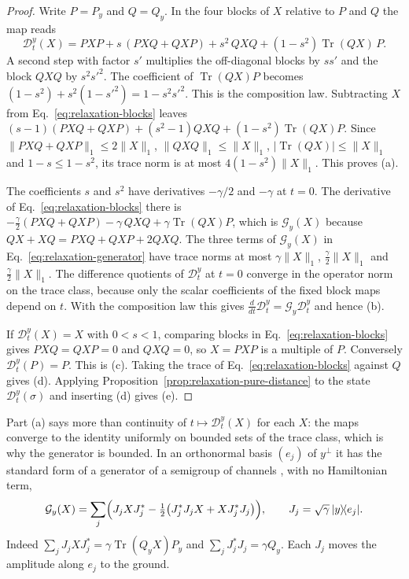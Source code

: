 \documentclass[11pt]{article}
\theoremstyle{definition}
\DeclareMathOperator{\Tr}{Tr}
\newcommand{\ket}[1]{\lvert #1\rangle}
\newcommand{\bra}[1]{\langle #1\rvert}
\begin{document}
\begin{proof}
Write $P=P_y$ and $Q=Q_y$. In the four blocks of $X$ relative to $P$ and $Q$ the map reads
\begin{equation}
 \mathcal D_t^y(X)=PXP+s\,(PXQ+QXP)+s^2\,QXQ+(1-s^2)\Tr(QX)\,P .
 \label{eq:relaxation-blocks}
\end{equation}
A second step with factor $s'$ multiplies the off-diagonal blocks by $ss'$ and the block $QXQ$ by $s^2s'^2$. The coefficient of $\Tr(QX)P$ becomes $(1-s^2)+s^2(1-s'^2)=1-s^2s'^2$. This is the composition law. Subtracting $X$ from Eq.~\eqref{eq:relaxation-blocks} leaves $(s-1)(PXQ+QXP)+(s^2-1)QXQ+(1-s^2)\Tr(QX)P$. Since $\|PXQ+QXP\|_1\le2\|X\|_1$, $\|QXQ\|_1\le\|X\|_1$, $|\Tr(QX)|\le\|X\|_1$ and $1-s\le1-s^2$, its trace norm is at most $4(1-s^2)\|X\|_1$. This proves (a).

The coefficients $s$ and $s^2$ have derivatives $-\gamma/2$ and $-\gamma$ at $t=0$. The derivative of Eq.~\eqref{eq:relaxation-blocks} there is $-\tfrac{\gamma}{2}(PXQ+QXP)-\gamma\,QXQ+\gamma\Tr(QX)P$, which is $\mathcal G_y(X)$ because $QX+XQ=PXQ+QXP+2QXQ$. The three terms of $\mathcal G_y(X)$ in Eq.~\eqref{eq:relaxation-generator} have trace norms at most $\gamma\|X\|_1$, $\tfrac{\gamma}{2}\|X\|_1$ and $\tfrac{\gamma}{2}\|X\|_1$. The difference quotients of $\mathcal D_t^y$ at $t=0$ converge in the operator norm on the trace class, because only the scalar coefficients of the fixed block maps depend on $t$. With the composition law this gives $\tfrac{d}{dt}\mathcal D_t^y=\mathcal G_y\mathcal D_t^y$ and hence (b).

If $\mathcal D_t^y(X)=X$ with $0<s<1$, comparing blocks in Eq.~\eqref{eq:relaxation-blocks} gives $PXQ=QXP=0$ and $QXQ=0$, so $X=PXP$ is a multiple of $P$. Conversely $\mathcal D_t^y(P)=P$. This is (c). Taking the trace of Eq.~\eqref{eq:relaxation-blocks} against $Q$ gives (d). Applying Proposition~\ref{prop:relaxation-pure-distance} to the state $\mathcal D_t^y(\sigma)$ and inserting (d) gives (e).
\end{proof}

Part (a) says more than continuity of $t\mapsto\mathcal D_t^y(X)$ for each $X$: the maps converge to the identity uniformly on bounded sets of the trace class, which is why the generator is bounded. In an orthonormal basis $(e_j)$ of $y^\perp$ it has the standard form of a generator of a semigroup of channels \cite{GKS1976,Lindblad1976}, with no Hamiltonian term,
\begin{equation}
 \mathcal G_y(X)=\sum_j\Bigl(J_jXJ_j^*-\tfrac12\bigl(J_j^*J_jX+XJ_j^*J_j\bigr)\Bigr),
 \qquad J_j=\sqrt\gamma\,\ket{y}\!\bra{e_j}.
 \label{eq:relaxation-jumps}
\end{equation}
Indeed $\sum_jJ_jXJ_j^*=\gamma\Tr(Q_yX)P_y$ and $\sum_jJ_j^*J_j=\gamma Q_y$. Each $J_j$ moves the amplitude along $e_j$ to the ground.
\end{document}
